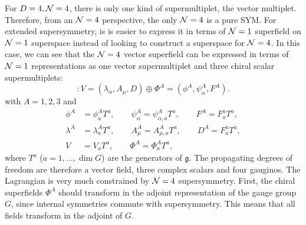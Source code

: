         For $D=4,\mathcal{N}=4$, there is only one kind of supermultiplet, the vector multiplet. Therefore, from an $\mathcal{N}=4$ perspective, the only $\mathcal{N}=4$ is a pure SYM. For extended supersymmetry, is is easier to express it in terms of $\mathcal{N}=1$ superfield on $\mathcal{N}=1$ superspace instead of looking to construct a superspace for $\mathcal{N}=4$. In this case, we can see that the $\mathcal{N} = 4$ vector superfield can be expressed in terms of $\mathcal{N} = 1$ representations as one vector supermultiplet and three chiral scalar supermultiplets:
        \begin{equation}
            [\mN = 4 \text{ vector multiplet}] : V = (\lambda_\alpha, A_\mu, D) \oplus \Phi^A = (\phi^A,\psi^A_\alpha,F^A).
        \end{equation}
        with $A=1,2,3$ and
        \begin{align}
            \phi^A&=\phi^A_a T^a,\qquad \psi^A_\alpha=\psi^A_{\alpha,a}T^a,\qquad F^A=F^a_a T^a,\\
            \lambda^A&=\lambda^A_a T^a,\qquad A^A_\mu=A^A_{\mu,a}T^a,\qquad D^A=F^a_a T^a,\\
            V&=V_aT^a,\qquad \Phi^A=\Phi^A_aT^a,
        \end{align}
        where $T^a$ ($a=1,\dots,\dim G$) are the generators of $\mathfrak{g}$. The propagating degrees of freedom are therefore a vector field, three complex scalars and four gauginos. The Lagrangian is very much constrained by $\mathcal{N} = 4$ supersymmetry. First, the chiral superfields $\Phi^A$ should transform in the adjoint representation of the gauge group $G$, since internal symmetries commute with supersymmetry. This means that all fields transform in the adjoint of $G$.
        
